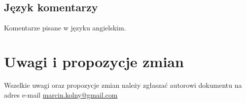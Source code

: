 \documentclass[titlepage]{article}
\begin{document}
\subsection{Język komentarzy}
Komentarze pisane w języku angielskim.
\section{Uwagi i propozycje zmian}
Wszelkie uwagi oraz propozycje zmian należy zgłaszać autorowi dokumentu na adres e-mail \href{mailto:marcin.kolny@gmail.com}{marcin.kolny@gmail.com}
\end{document}
